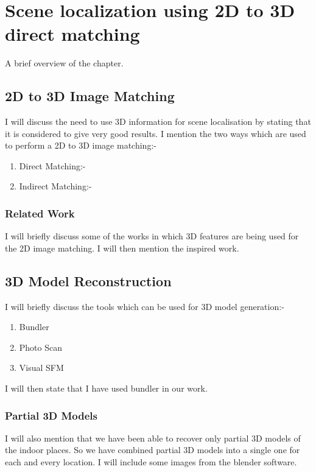 \chapter{Scene localization using 2D to 3D direct matching}
A brief overview of the chapter. 

\section{2D to 3D Image Matching}
I will discuss the need to use 3D information 
for scene localisation by stating that it is considered 
to give very good results. 
I mention the two ways which are used 
to perform a 2D to 3D image matching:-

\begin{enumerate}
\item Direct Matching:-
\item Indirect Matching:-
\end{enumerate}

\subsection{Related Work}
I will briefly discuss some of the 
works in which 3D features are being used 
for the 2D image matching. I will then mention
the inspired work.

\section{3D Model Reconstruction}
I will briefly discuss the tools which can 
be used for 3D model generation:- 


\begin{enumerate}
\item Bundler
\item Photo Scan
\item Visual SFM
\end{enumerate}

I will then state that I have used bundler in our work. 

\subsection{Partial 3D Models}
I will also mention that we have been able to recover only 
partial 3D models of the indoor places. So we have 
combined partial 3D models into a single one for 
each and every location. 
I will include some images from the 
blender software.

